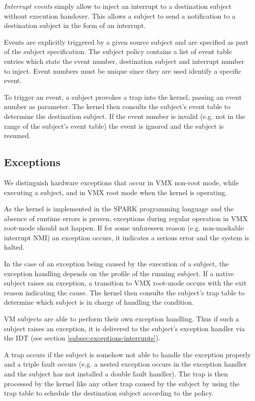 \emph{Interrupt events} simply allow to inject an interrupt to a destination
subject without execution handover. This allows a subject to send a notification
to a destination subject in the form of an interrupt.

Events are explicitly triggered by a given source subject and are specified as
part of the subject specification. The subject policy contains a list of event
table entries which state the event number, destination subject and interrupt
number to inject. Event numbers must be unique since they are used identify a
specific event.

To trigger an event, a subject provokes a trap into the kernel, passing an
event number as parameter. The kernel then consults the subject's event table
to determine the destination subject. If the event number is invalid (e.g. not
in the range of the subject's event table) the event is ignored and the subject
is resumed.

\subsection{Exceptions}\label{subsec:design-exceptions}
We distinguish hardware exceptions that occur in VMX non-root mode, while
executing a subject, and in VMX root mode when the kernel is operating.

As the kernel is implemented in the SPARK programming language and the absence
of runtime errors is proven, exceptions during regular operation in VMX
root-mode should not happen. If for some unforeseen reason (e.g. non-maskable
interrupt NMI) an exception occurs, it indicates a serious error and the system
is halted.

In the case of an exception being caused by the execution of a subject, the
exception handling depends on the profile of the running subject. If a native
subject raises an exception, a transition to VMX root-mode occurs with the exit
reason indicating the cause. The kernel then consults the subject's trap table
to determine which subject is in charge of handling the condition.

VM subjects are able to perform their own exception handling. Thus if such a
subject raises an exception, it is delivered to the subject's exception handler
via the IDT (see section \ref{subsec:exceptions-interrupts}).

A trap occurs if the subject is somehow not able to handle the exception
properly and a triple fault occurs (e.g. a nested exception occurs in the
exception handler and the subject has not installed a double fault handler).
The trap is then processed by the kernel like any other trap caused by the
subject by using the trap table to schedule the destination subject according to
the policy.


